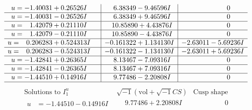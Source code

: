 \documentclass[1p]{elsarticle_modified}
\theoremstyle{definition}
\newcommand{\I}{\sqrt{-1}}
\begin{document}
$$\begin{array}{c|c|c}
\begin{aligned}
u &= -1.40031 + 0.26526 I\end{aligned}
 & \phantom{-}6.38349 - 9.46596 I & \phantom{-0.000000 } 0 \\ \hline\begin{aligned}
u &= -1.40031 - 0.26526 I\end{aligned}
 & \phantom{-}6.38349 + 9.46596 I & \phantom{-0.000000 } 0 \\ \hline\begin{aligned}
u &= \phantom{-}1.42079 + 0.21110 I\end{aligned}
 & \phantom{-}10.85890 + 4.43876 I & \phantom{-0.000000 } 0 \\ \hline\begin{aligned}
u &= \phantom{-}1.42079 - 0.21110 I\end{aligned}
 & \phantom{-}10.85890 - 4.43876 I & \phantom{-0.000000 } 0 \\ \hline\begin{aligned}
u &= \phantom{-}0.206283 + 0.524313 I\end{aligned}
 & -0.161322 + 1.134130 I & -2.63011 - 5.69236 I \\ \hline\begin{aligned}
u &= \phantom{-}0.206283 - 0.524313 I\end{aligned}
 & -0.161322 - 1.134130 I & -2.63011 + 5.69236 I \\ \hline\begin{aligned}
u &= -1.42841 + 0.26365 I\end{aligned}
 & \phantom{-}8.13467 - 7.09316 I & \phantom{-0.000000 } 0 \\ \hline\begin{aligned}
u &= -1.42841 - 0.26365 I\end{aligned}
 & \phantom{-}8.13467 + 7.09316 I & \phantom{-0.000000 } 0 \\ \hline\begin{aligned}
u &= -1.44510 + 0.14916 I\end{aligned}
 & \phantom{-}9.77486 - 2.20808 I & \phantom{-0.000000 } 0\\
 \hline 
 \end{array}$$\newpage$$\begin{array}{c|c|c}  
\text{Solutions to }I^u_{1}& \I (\text{vol} + \sqrt{-1}CS) & \text{Cusp shape}\\
 \hline 
\begin{aligned}
u &= -1.44510 - 0.14916 I\end{aligned}
 & \phantom{-}9.77486 + 2.20808 I & \phantom{-0.000000 } 0 \\ \hline\begin{aligned}

\end{aligned}
\end{array}$$
\end{document}
